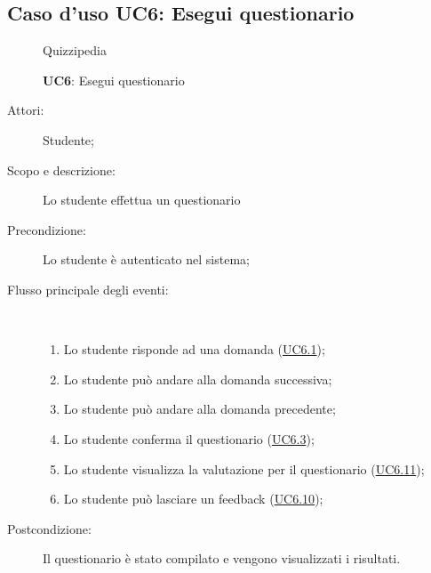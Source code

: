 \subsection{Caso d'uso UC6: Esegui questionario}
	\begin{figure}[H]
		\centering
		\begin{resizedtikzpicture}{\textwidth}
		\begin{umlsystem}[x=0, fill=lightgray!20]{Quizzipedia}
		\end{umlsystem}
		\end{resizedtikzpicture}
		\caption{\textbf{UC6}: Esegui questionario}
		\label{UC6}
	\end{figure}
\begin{description}
\item[Attori:] Studente;
\item[Scopo e descrizione:] Lo studente effettua un questionario
      \item[Precondizione:] Lo studente è autenticato nel sistema;

        \item[Flusso principale degli eventi:] \ 
 \begin{enumerate}
          \item Lo studente risponde ad una domanda (\hyperlink{UC6.1}{UC6.1});
          \item Lo studente può andare alla domanda successiva;
          \item Lo studente può andare alla domanda precedente;
          \item Lo studente conferma il questionario (\hyperlink{UC6.3}{UC6.3});
          \item Lo studente visualizza la valutazione per il questionario (\hyperlink{UC6.11}{UC6.11});
          \item Lo studente può lasciare un feedback (\hyperlink{UC6.10}{UC6.10});

      \end{enumerate}
    \item[Postcondizione:] Il questionario è stato compilato e vengono visualizzati i risultati.
  \end{description}
\hypertarget{UC6.1}{}
